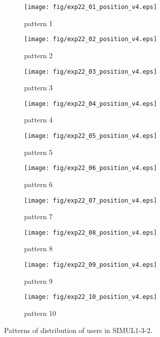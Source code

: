 	\begin{figure}
		\begin{center}
			\begin{subfigure}[b]{0.32\textwidth}
				\texttt{[image: fig/exp22\_01\_position\_v4.eps]}
				\caption{pattern 1}
				\label{figure:simul1_3_2_a}
			\end{subfigure}
			\begin{subfigure}[b]{0.32\textwidth}
				\texttt{[image: fig/exp22\_02\_position\_v4.eps]}
				\caption{pattern 2}
				\label{figure:simul1_3_2_b}
			\end{subfigure}
			\begin{subfigure}[b]{0.32\textwidth}
				\texttt{[image: fig/exp22\_03\_position\_v4.eps]}
				\caption{pattern 3}
				\label{figure:simul1_3_2_c}
			\end{subfigure}
			\begin{subfigure}[b]{0.32\textwidth}
				\texttt{[image: fig/exp22\_04\_position\_v4.eps]}
				\caption{pattern 4}
				\label{figure:simul1_3_2_d}
			\end{subfigure}
			\begin{subfigure}[b]{0.32\textwidth}
				\texttt{[image: fig/exp22\_05\_position\_v4.eps]}
				\caption{pattern 5}
				\label{figure:simul1_3_2_e}
			\end{subfigure}
			\begin{subfigure}[b]{0.32\textwidth}
				\texttt{[image: fig/exp22\_06\_position\_v4.eps]}
				\caption{pattern 6}
				\label{figure:simul1_3_2_f}
			\end{subfigure}
			\begin{subfigure}[b]{0.32\textwidth}
				\texttt{[image: fig/exp22\_07\_position\_v4.eps]}
				\caption{pattern 7}
				\label{figure:simul1_3_2_g}
			\end{subfigure}
			\begin{subfigure}[b]{0.32\textwidth}
				\texttt{[image: fig/exp22\_08\_position\_v4.eps]}
				\caption{pattern 8}
				\label{figure:simul1_3_2_h}
			\end{subfigure}
			\begin{subfigure}[b]{0.32\textwidth}
				\texttt{[image: fig/exp22\_09\_position\_v4.eps]}
				\caption{pattern 9}
				\label{figure:simul1_3_2_i}
			\end{subfigure}
			\begin{subfigure}[b]{0.32\textwidth}
				\texttt{[image: fig/exp22\_10\_position\_v4.eps]}
				\caption{pattern 10}
				\label{figure:simul1_3_2_j}
			\end{subfigure}
			\caption{Patterns of distribution of users in SIMUL1-3-2.}
			\label{figure:simul1_3_2_p}
		\end{center}
	\end{figure}
	
